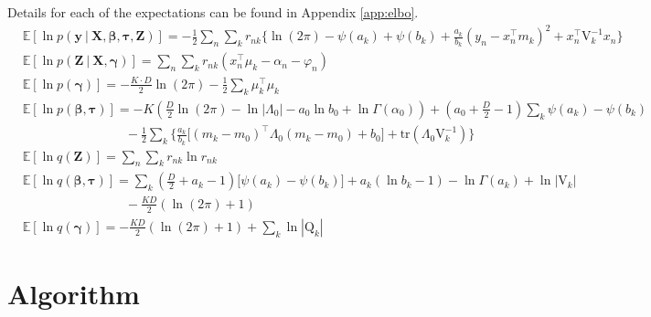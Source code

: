 \documentclass[twoside,11pt]{article}
\newcommand\given[1][]{\:#1\vert\:}
\newcommand{\transpose}[1]{#1^{\intercal}}
\newcommand{\nsum}{\sum\limits_{n}}
\newcommand{\ksum}{\sum\limits_{k}}
\newcommand{\boldbeta}{\boldsymbol\beta}
\newcommand{\boldgamma}{\boldsymbol\gamma}
\newcommand{\boldtau}{\boldsymbol\tau}
\newcommand{\E}{\mathbb{E}}
\newcommand{\pr}[1]{p \left( #1 \right)}
\begin{document}
Details for each of the expectations can be found in Appendix \ref{app:elbo}. 
\begin{align*}
	& \E[\ln\pr{\mathbf{y} \given \mathbf{X}, \boldbeta, \boldtau, \mathbf{Z}}] = -\frac{1}{2}\nsum \ksum r_{nk} \Big\{ \ln (2\pi) - \psi(a_k) + \psi(b_k)  + \frac{a_k}{b_k}(y_n - \transpose{x_n}m_k)^2 + \transpose{x_n}\mathrm{V}_k^{-1}x_n \Big\} \\
	 & \E[\ln \pr{\mathbf{Z} \given \mathbf{X}, \boldgamma}] = \nsum \ksum r_{nk} \left( \transpose{x_n}\mu_k - \alpha_n - \varphi_n \right) \\
	 & \E[\ln \pr{\boldgamma}] = - \frac{K \cdot D}{2} \ln (2\pi) - \frac{1}{2} \ksum \transpose{\mu_k}\mu_k \\
	 & \E[\ln \pr{\boldbeta, \boldtau}] = - K \left(\frac{D}{2}\ln(2\pi)  - \ln |\Lambda_0| - a_0 \ln b_0 + \ln \Gamma(\alpha_0) \right) + \left( a_0 + \frac{D}{2} - 1 \right) \ksum \psi(a_k) - \psi(b_k) \\
	   & \qquad \qquad \qquad \qquad - \frac{1}{2}\ksum \Bigg\{ \frac{a_k}{b_k}\Big[\transpose{(m_k - m_0)} \Lambda_0 (m_k - m_0) + b_0 \Big] + \mathrm{tr} \left( \Lambda_0 \mathrm{V}_{k}^{-1}\right) \Bigg\} \\
	& \E[\ln q(\mathbf{Z})] =  \nsum \ksum r_{nk} \ln r_{nk} \\
	& \E[\ln q(\boldbeta, \boldtau)] =  \ksum \left( \frac{D}{2} + a_k - 1 \right) \big[\psi(a_k) - \psi(b_k) \big] + a_k (\ln b_k - 1) - \ln \Gamma(a_k) + \ln |\mathrm{V}_k | \\
	& \qquad \qquad \qquad \qquad -\frac{KD}{2} \left( \ln(2\pi) + 1 \right) \\
	& \E[\ln q(\boldgamma)] = - \frac{KD}{2}(\ln (2\pi) + 1) + \sum_{k} \ln|\mathrm{Q}_k|
\end{align*}

\newpage

\section{Algorithm} \label{alg1}
\end{document}
